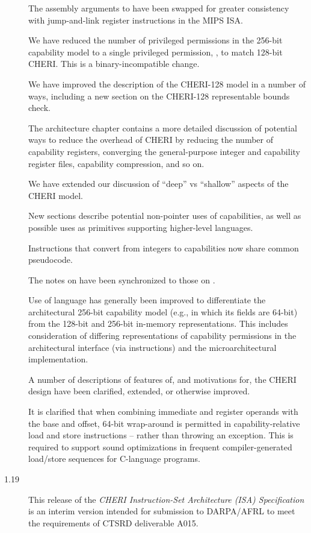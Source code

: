 \begin{description}
  The assembly arguments to  have been swapped for greater
  consistency with jump-and-link register instructions in the MIPS ISA.

  We have reduced the number of privileged permissions in the 256-bit capability
  model to a single privileged permission, \cappermASR, to match
  128-bit CHERI.
  This is a binary-incompatible change.

  We have improved the description of the CHERI-128 model in a number of ways,
  including a new section on the CHERI-128 representable bounds check.

  The architecture chapter contains a more detailed discussion of potential ways
  to reduce the overhead of CHERI by reducing the number of capability
  registers, converging the general-purpose integer and capability register files,
  capability compression, and so on.

  We have extended our discussion of ``deep'' vs ``shallow'' aspects of the
  CHERI model.

  New sections describe potential non-pointer uses of capabilities, as well as
  possible uses as primitives supporting higher-level languages.

  Instructions that convert from integers to capabilities now share common
   pseudocode.

  The notes on  have been synchronized to those on
  .

  Use of language has generally been improved to differentiate the
  architectural 256-bit capability model (e.g., in which its fields are
  64-bit) from the 128-bit and 256-bit in-memory representations.
  This includes consideration of differing representations of capability
  permissions in the architectural interface (via instructions) and the
  microarchitectural implementation.

  A number of descriptions of features of, and motivations for, the CHERI design
  have been clarified, extended, or otherwise improved.

  It is clarified that when combining immediate and register operands with
  the base and offset, 64-bit wrap-around is permitted in capability-relative
  load and store instructions -- rather than throwing an exception.
  This is required to support sound optimizations in frequent
  compiler-generated load/store sequences for C-language programs.

\item[1.19] This release of the \textit{CHERI Instruction-Set Architecture
  (ISA) Specification} is an interim version intended for submission to
  DARPA/AFRL to meet the requirements of CTSRD deliverable A015.


\end{description}
